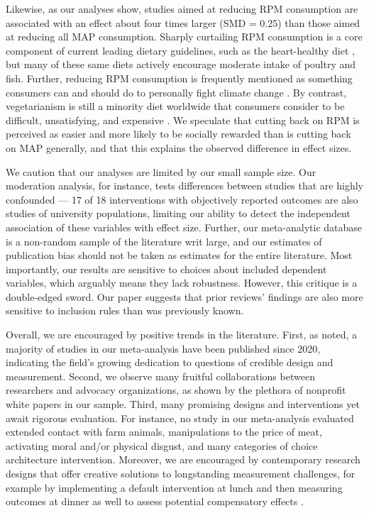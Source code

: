 \documentclass[sn-nature,referee,pdflatex]{sn-jnl}
\begin{document}
Likewise, as our analyses show, studies aimed at reducing RPM
consumption are associated with an effect about four times larger (SMD =
0.25) than those aimed at reducing all MAP consumption. Sharply
curtailing RPM consumption is a core component of current leading
dietary guidelines, such as the heart-healthy diet \citep{diab2023}, but
many of these same diets actively encourage moderate intake of poultry
and fish. Further, reducing RPM consumption is frequently mentioned as
something consumers can and should do to personally fight climate change
\citep{auclair2024}. By contrast, vegetarianism is still a minority diet
worldwide \citep{tilman2014} that consumers consider to be difficult,
unsatisfying, and expensive \citep{bryant2019}. We speculate that
cutting back on RPM is perceived as easier and more likely to be
socially rewarded than is cutting back on MAP generally, and that this
explains the observed difference in effect sizes.

We caution that our analyses are limited by our small sample size. Our
moderation analysis, for instance, tests differences between studies
that are highly confounded --- 17 of 18 interventions with objectively
reported outcomes are also studies of university populations, limiting
our ability to detect the independent association of these variables
with effect size. Further, our meta-analytic database is a non-random
sample of the literature writ large, and our estimates of publication
bias should not be taken as estimates for the entire literature. Most
importantly, our results are sensitive to choices about included
dependent variables, which arguably means they lack robustness. However,
this critique is a double-edged sword. Our paper suggests that prior
reviews' findings are also more sensitive to inclusion rules than was
previously known.

Overall, we are encouraged by positive trends in the literature. First,
as noted, a majority of studies in our meta-analysis have been published
since 2020, indicating the field's growing dedication to questions of
credible design and measurement. Second, we observe many fruitful
collaborations between researchers and advocacy organizations, as shown
by the plethora of nonprofit white papers in our sample. Third, many
promising designs and interventions yet await rigorous evaluation. For
instance, no study in our meta-analysis evaluated extended contact with
farm animals, manipulations to the price of meat, activating moral
and/or physical disgust, and many categories of choice architecture
intervention. Moreover, we are encouraged by contemporary research
designs that offer creative solutions to longstanding measurement
challenges, for example by implementing a default intervention at lunch
and then measuring outcomes at dinner as well to assess potential
compensatory effects \citep{vocski2024}.
\end{document}
